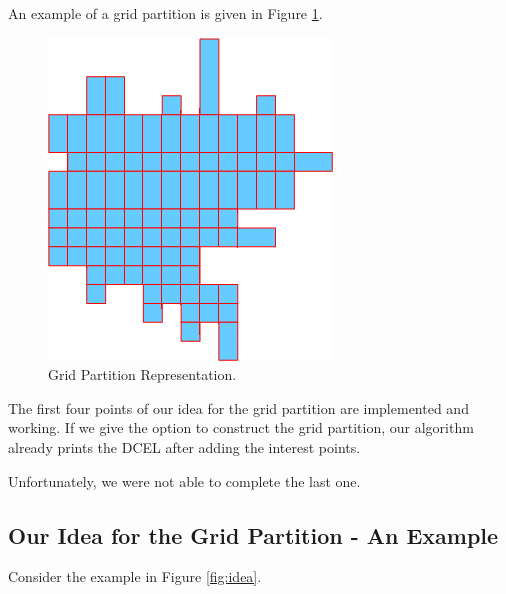 \documentclass[12pt,a4paper,oneside]{article}
\begin{document}
An example of a grid partition is given in Figure \ref{fig:grid}.

\begin{figure}[h!]
  \centering \includegraphics[scale=0.5]{gridPartition.png}
  \caption{Grid Partition Representation.}
  \label{fig:grid}
\end{figure}

The first four points of our idea for the grid partition are implemented and working. If we give the option to construct the grid partition, our algorithm already prints the DCEL after adding the interest points.

Unfortunately, we were not able to complete the last one.

\subsection{Our Idea for the Grid Partition - An Example}\label{subsec:gridex}

Consider the example in Figure \ref{fig:idea}.
\end{document}
